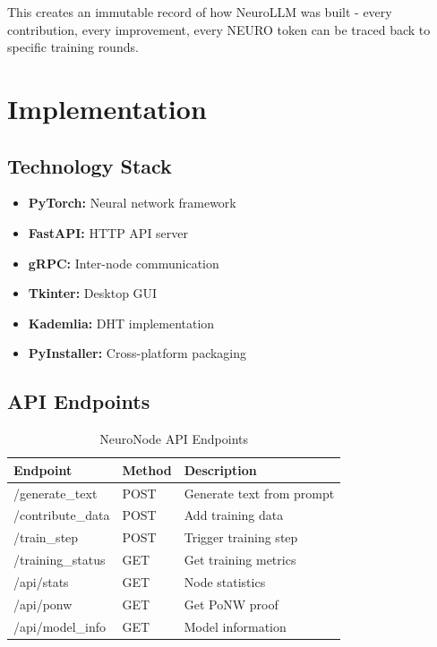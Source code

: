 \documentclass[11pt,a4paper]{article}
\begin{document}
This creates an immutable record of how NeuroLLM was built - every contribution, every improvement, every NEURO token can be traced back to specific training rounds.

\section{Implementation}

\subsection{Technology Stack}

\begin{itemize}
    \item \textbf{PyTorch:} Neural network framework
    \item \textbf{FastAPI:} HTTP API server
    \item \textbf{gRPC:} Inter-node communication
    \item \textbf{Tkinter:} Desktop GUI
    \item \textbf{Kademlia:} DHT implementation
    \item \textbf{PyInstaller:} Cross-platform packaging
\end{itemize}

\subsection{API Endpoints}

\begin{table}[H]
\centering
\caption{NeuroNode API Endpoints}
\begin{tabular}{@{}lll@{}}
\toprule
\textbf{Endpoint} & \textbf{Method} & \textbf{Description} \\
\midrule
/generate\_text & POST & Generate text from prompt \\
/contribute\_data & POST & Add training data \\
/train\_step & POST & Trigger training step \\
/training\_status & GET & Get training metrics \\
/api/stats & GET & Node statistics \\
/api/ponw & GET & Get PoNW proof \\
/api/model\_info & GET & Model information \\
\bottomrule
\end{tabular}
\end{table}
\end{document}
